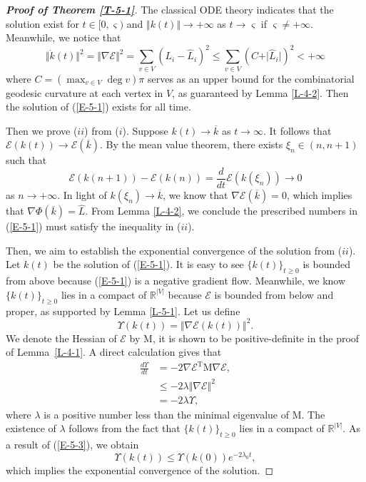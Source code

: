 \documentclass[11pt,leqno]{article}
\numberwithin{equation}{section}
\theoremstyle{definition}
\begin{document}
\begin{proof}[\textbf{Proof of Theorem \ref{T-5-1}}]
The classical ODE theory indicates that the solution exist for $t\in[0,\varsigma)$ and $\Vert k(t)\Vert\to+\infty$ as $t\to\varsigma$ if $\varsigma\neq+\infty$. Meanwhile, we notice that
\[\Vert\dot k(t)\Vert^2=\Vert\nabla\mathcal E\Vert^2=\sum_{v\in V}(L_i-\hat L_i)^2\leq\sum_{v\in V}(C+\vert\hat L_i\vert)^2<+\infty\]
where $C=(\max_{v\in V}\deg v)\pi$ serves as an upper bound for the combinatorial geodesic curvature at each vertex in
$V$, as guaranteed by Lemma \ref{L-4-2}. Then the solution of (\ref{E-5-1}) exists for all time.

Then we prove ($ii$) from ($i$). Suppose $k(t)\to\overline k$ as $t\to\infty$. It follows that $\mathcal E(k(t))\to\mathcal E(\overline k)$. By the mean value theorem, there exists $\xi_n\in(n,n+1)$ such that
\[
\mathcal E(k(n+1))-\mathcal E(k(n))=\frac{d}{dt}\mathcal E(k(\xi_n))\to 0
\]
as $n\to+\infty$. 
In light of $k(\xi_n)\to \overline k$, we know that $\nabla\mathcal E(\overline k)=0$, which implies that $\nabla \Phi(\overline k)=\hat{L}$. From Lemma \ref{L-4-2}, we conclude the prescribed numbers in (\ref{E-5-1}) must satisfy the inequality in ($ii$).

Then, we aim to establish the exponential convergence of the solution from ($ii$).
Let $k(t)$ be the solution of (\ref{E-5-1}).  It is easy to see $\{k(t)\}_{t\geq 0}$ is bounded from above because (\ref{E-5-1}) is a negative gradient flow. Meanwhile, we know $\{k(t)\}_{t\geq 0}$ lies in a compact of $\mathbb{R}^{|V|}$ because $\mathcal E$ is bounded from below and proper, as supported by Lemma \ref{L-5-1}.
Let us define
\[\Upsilon(k(t))=\Vert\nabla\mathcal E(k(t))\Vert^2.\]
We denote the Hessian of $\mathcal E$ by $\mathrm{M}$, it is shown to be positive-definite in the proof of Lemma~\ref{L-4-1}. A direct calculation gives that
\begin{equation}\label{E-5-3}\begin{aligned}
\frac{d\Upsilon}{dt}&=-2\nabla\mathcal E^{\mathrm{T}}\mathrm{M}\nabla\mathcal E,\\
&\leq-2\lambda\Vert\nabla\mathcal E\Vert^2\\
&=-2\lambda \Upsilon,
\end{aligned}\end{equation}
where $\lambda$ is a positive number less than the minimal eigenvalue of $\mathrm{M}$.
The existence of $\lambda$ follows from the fact that $\{k(t)\}_{t\geq 0}$ lies in a compact of $\mathbb{R}^{|V|}$.
As a result of (\ref{E-5-3}), we obtain
\[\Upsilon\left(k(t)\right)\leq\Upsilon(k(0))e^{-2\lambda_0 t},\]
which implies the exponential convergence of the solution.
\end{proof}
\end{document}

